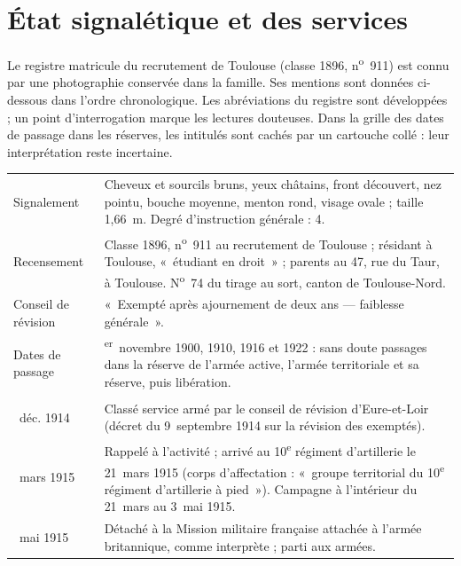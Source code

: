 \section{État signalétique et des services}\label{annexe-services}

Le registre matricule du recrutement de Toulouse (classe 1896, n\textsuperscript{o}~911) est connu par une photographie conservée dans la famille. Ses mentions sont données ci-dessous dans l'ordre chronologique. Les abréviations du registre sont développées ; un point d'interrogation marque les lectures douteuses. Dans la grille des dates de passage dans les réserves, les intitulés sont cachés par un cartouche collé : leur interprétation reste incertaine.

\begin{center}
\small
\renewcommand{\arraystretch}{1.18}
\begin{longtable}{@{}>{\raggedright\arraybackslash}p{27mm}>{\raggedright\arraybackslash}p{109.5mm}@{}}
\toprule
\multicolumn{2}{@{}l}{\textit{Signalement et état civil}}\\
\midrule
Signalement & Cheveux et sourcils bruns, yeux châtains, front découvert, nez pointu, bouche moyenne, menton rond, visage ovale ; taille 1,66~m. Degré d'instruction générale : 4.\\
Recensement & Classe 1896, n\textsuperscript{o}~911 au recrutement de Toulouse ; résidant à Toulouse, «~étudiant en droit~» ; parents au 47, rue du Taur, à Toulouse. N\textsuperscript{o}~74 du tirage au sort, canton de Toulouse-Nord.\\
Conseil de révision & «~Exempté après ajournement de deux ans — faiblesse générale~».\\
Dates de passage & 1\textsuperscript{er}~novembre 1900, 1910, 1916 et 1922 : sans doute passages dans la réserve de l'armée active, l'armée territoriale et sa réserve, puis libération.\\
\midrule
\multicolumn{2}{@{}l}{\textit{Services}}\\
\midrule
18~déc. 1914 & Classé service armé par le conseil de révision d'Eure-et-Loir (décret du 9~septembre 1914 sur la révision des exemptés).\\
20~mars 1915 & Rappelé à l'activité ; arrivé au 10\textsuperscript{e} régiment d'artillerie le 21~mars 1915 (corps d'affectation : «~groupe territorial du 10\textsuperscript{e} régiment d'artillerie à pied~»). Campagne à l'intérieur du 21~mars au 3~mai 1915.\\
4~mai 1915 & Détaché à la Mission militaire française attachée à l'armée britannique, comme interprète ; parti aux armées.\\

\end{longtable}
\end{center}
